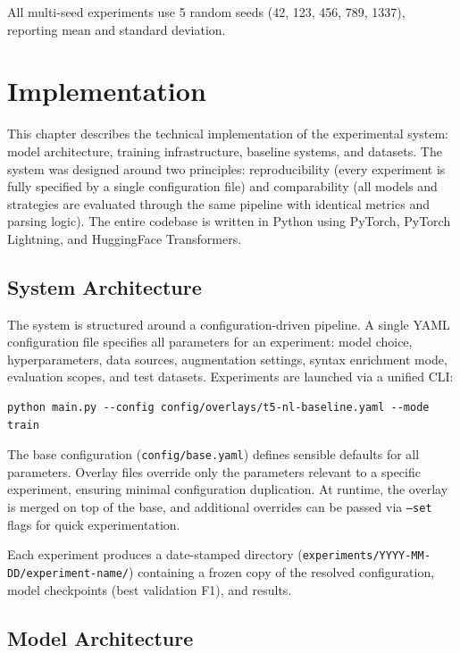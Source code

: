 \documentclass[12pt,a4paper]{report}
\begin{document}
All multi-seed experiments use 5 random seeds (42, 123, 456, 789, 1337), reporting mean and standard deviation.



\chapter{Implementation}\label{ch:implementation}

This chapter describes the technical implementation of the experimental system: model architecture, training infrastructure, baseline systems, and datasets. The system was designed around two principles: reproducibility (every experiment is fully specified by a single configuration file) and comparability (all models and strategies are evaluated through the same pipeline with identical metrics and parsing logic). The entire codebase is written in Python using PyTorch, PyTorch Lightning, and HuggingFace Transformers.

\section{System Architecture}

The system is structured around a configuration-driven pipeline. A single YAML configuration file specifies all parameters for an experiment: model choice, hyperparameters, data sources, augmentation settings, syntax enrichment mode, evaluation scopes, and test datasets. Experiments are launched via a unified CLI:

\begin{lstlisting}
python main.py --config config/overlays/t5-nl-baseline.yaml --mode train
\end{lstlisting}

The base configuration (\texttt{config/base.yaml}) defines sensible defaults for all parameters. Overlay files override only the parameters relevant to a specific experiment, ensuring minimal configuration duplication. At runtime, the overlay is merged on top of the base, and additional overrides can be passed via \texttt{--set} flags for quick experimentation.

Each experiment produces a date-stamped directory (\texttt{experiments/YYYY-MM-DD/experiment-name/}) containing a frozen copy of the resolved configuration, model checkpoints (best validation F1), and results.


\section{Model Architecture}
\end{document}
